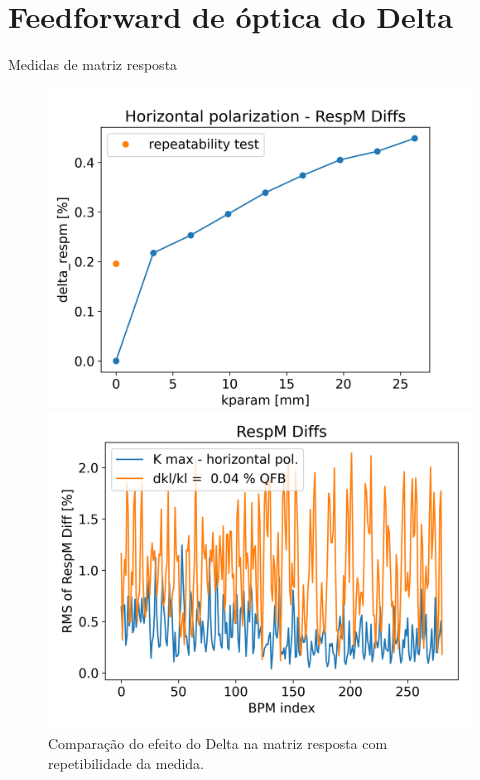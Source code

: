 \documentclass[1611]{beamer}            %
\begin{document}
\section{Feedforward de óptica do Delta}

\begin{frame}{Medidas de matriz resposta}
  \begin{figure}[ht]
        \begin{minipage}[b]{0.45\linewidth}
            \centering
            \includegraphics[width=\textwidth]{2024-05-10/figures/repeatability.png}
            \caption{Comparação do efeito do Delta na matriz resposta com repetibilidade da medida.}
            \label{fig:a}
        \end{minipage}
        \hspace{0.5cm}
        \begin{minipage}[b]{0.45\linewidth}
            \centering
            \includegraphics[width=\textwidth]{2024-05-10/figures/Matrix_diff.png}

\end{minipage}
\end{figure}
\end{frame}
\end{document}
